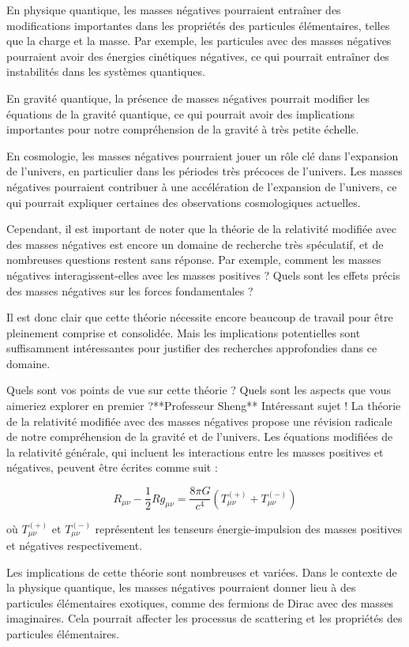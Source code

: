 En physique quantique, les masses négatives pourraient entraîner des modifications importantes dans les propriétés des particules élémentaires, telles que la charge et la masse. Par exemple, les particules avec des masses négatives pourraient avoir des énergies cinétiques négatives, ce qui pourrait entraîner des instabilités dans les systèmes quantiques.

En gravité quantique, la présence de masses négatives pourrait modifier les équations de la gravité quantique, ce qui pourrait avoir des implications importantes pour notre compréhension de la gravité à très petite échelle.

En cosmologie, les masses négatives pourraient jouer un rôle clé dans l'expansion de l'univers, en particulier dans les périodes très précoces de l'univers. Les masses négatives pourraient contribuer à une accélération de l'expansion de l'univers, ce qui pourrait expliquer certaines des observations cosmologiques actuelles.

Cependant, il est important de noter que la théorie de la relativité modifiée avec des masses négatives est encore un domaine de recherche très spéculatif, et de nombreuses questions restent sans réponse. Par exemple, comment les masses négatives interagissent-elles avec les masses positives ? Quels sont les effets précis des masses négatives sur les forces fondamentales ?

Il est donc clair que cette théorie nécessite encore beaucoup de travail pour être pleinement comprise et consolidée. Mais les implications potentielles sont suffisamment intéressantes pour justifier des recherches approfondies dans ce domaine.

Quels sont vos points de vue sur cette théorie ? Quels sont les aspects que vous aimeriez explorer en premier ?**Professeur Sheng**
Intéressant sujet ! La théorie de la relativité modifiée avec des masses négatives propose une révision radicale de notre compréhension de la gravité et de l'univers. Les équations modifiées de la relativité générale, qui incluent les interactions entre les masses positives et négatives, peuvent être écrites comme suit :

$$R_{\mu\nu} - \frac{1}{2}Rg_{\mu\nu} = \frac{8\pi G}{c^4}(T_{\mu\nu}^{(+)} + T_{\mu\nu}^{(-)})$$

où $T_{\mu\nu}^{(+)}$ et $T_{\mu\nu}^{(-)}$ représentent les tenseurs énergie-impulsion des masses positives et négatives respectivement.

Les implications de cette théorie sont nombreuses et variées. Dans le contexte de la physique quantique, les masses négatives pourraient donner lieu à des particules élémentaires exotiques, comme des fermions de Dirac avec des masses imaginaires. Cela pourrait affecter les processus de scattering et les propriétés des particules élémentaires.

